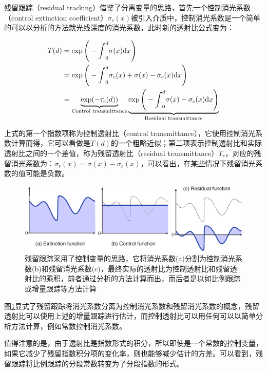 残留跟踪（residual tracking）借鉴了分离变量的思路，首先一个控制消光系数（control extinction coefficient）$\sigma_c(x)$被引入介质中，控制消光系数是一个简单的可以以分析的方法就光线深度的消光系数，此时新的透射比公式变为：

\begin{equation}\label{e:pm-residual}
\begin{aligned}
	T(d)&=\exp\Bigg(-{\rm \int}^{d}_0\sigma(x){\rm d}x\Bigg)\\
	&=\exp\Bigg(-{\rm \int}^{d}_0\sigma_c(x)+\sigma(x)-\sigma_c(x){\rm d}x\Bigg)\\	
	&=\underbrace{\exp(-\tau_c(d))}_{\text{Control transmittance}}\underbrace{\exp\Bigg(-{\rm \int}^{d}_0\sigma(x)-\sigma_c(x){\rm d}x\Bigg)}_{\text{Residual transmittance}}
\end{aligned}
\end{equation}

上式的第一个指数项称为控制透射比（control transmittance），它使用控制消光系数计算而得，它可以看做是$T(d)$的一个粗略近似；第二项表示控制透射比和实际透射比之间的一个差值，称为残留透射比（residual transmittance）$T_r$，对应的残留消光系数为：$\sigma_r(x)=\sigma(x)-\sigma_c(x)$，可以看出，在某些情况下残留消光系数的值可能是负数。

\begin{figure}
	\includegraphics[width=1.0\textwidth]{figures/pm/residual}
	\caption{残留跟踪采用了控制变量的思路，它将消光系数(a)分割为控制消光系数(b)和残留消光系数(c)，最终实际的透射比为控制透射比和残留透射比的乘积，前者通过分析的方法计算而出，而后者是以如比例跟踪或增量跟踪等方法计算}
	\label{f:pm-residual}
\end{figure}

图\ref{f:pm-residual}显式了残留跟踪将消光系数分离为控制消光系数和残留消光系数的概念，残留透射比可以使用上述的增量跟踪进行估计，而控制透射比可以用任何可以以简单分析方法计算，例如常数控制消光系数。

值得注意的是，由于透射比是指数形式的积分，所以即使是一个常数的控制变量，如果它减少了残留指数积分项的变化率，则也能够减少估计的方差。可以看到，残留跟踪将比例跟踪的分段常数转变为了分段指数的形式。

